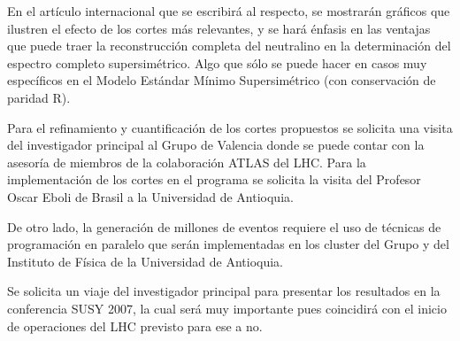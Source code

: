 \begin{ideas}
En el artículo internacional que se escribirá al respecto, se
mostrarán gráficos que ilustren el efecto de los cortes más
relevantes, y se hará énfasis en las ventajas que puede traer la
reconstrucción completa del neutralino en la determinación del
espectro completo supersimétrico. Algo que sólo se puede hacer en
casos muy específicos en el Modelo Estándar Mínimo Supersimétrico (con
conservación de paridad R).

Para el refinamiento y cuantificación de los cortes propuestos se
solicita una visita del investigador principal al Grupo de Valencia
donde se puede contar con la asesoría de miembros de la colaboración
ATLAS del LHC. Para la implementación de los cortes en el programa se
solicita la visita del Profesor Oscar Eboli de Brasil a la Universidad
de Antioquia.

De otro lado, la generación de millones de eventos requiere el uso de
técnicas de programación en paralelo que serán implementadas en los
cluster del Grupo y del Instituto de Física de la Universidad de
Antioquia.

Se solicita un viaje del investigador principal para presentar los
resultados en la conferencia SUSY 2007, la cual será muy importante
pues coincidirá con el inicio de operaciones del LHC previsto para ese
a no.


\end{ideas}
